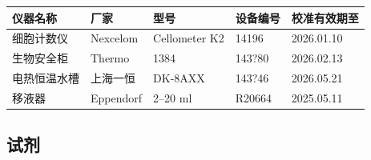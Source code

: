 \documentclass[UTF8,10pt,a4paper,fontset=fandol]{ctexart}
\newcommand{\fieldvalue}[1]{#1}
\newcommand{\handwritten}[1]{#1}
\begin{document}
\begin{tabularx}{\textwidth}{|l|X|X|X|X|}
\hline
仪器名称 & 厂家 & 型号 & 设备编号 & 校准有效期至\\
\hline
细胞计数仪 &
\fieldvalue{Nexcelom} &
\fieldvalue{Cellometer K2} &
\fieldvalue{\handwritten{14196}} &
\fieldvalue{\handwritten{2026.01.10}}\\
\hline
生物安全柜 &
\fieldvalue{Thermo} &
\fieldvalue{\handwritten{1384}} &
\fieldvalue{\handwritten{143?80}} &
\fieldvalue{\handwritten{2026.02.13}}\\
\hline
电热恒温水槽 &
\fieldvalue{上海一恒} &
\fieldvalue{\handwritten{DK-8AXX}} &
\fieldvalue{\handwritten{143?46}} &
\fieldvalue{\handwritten{2026.05.21}}\\
\hline
移液器 &
\fieldvalue{Eppendorf} &
\fieldvalue{\handwritten{2--20 ml}} &
\fieldvalue{\handwritten{R20664}} &
\fieldvalue{\handwritten{2025.05.11}}\\
\hline
\end{tabularx}

\subsection{试剂}
\end{document}
